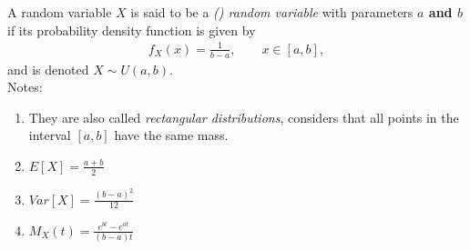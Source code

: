\documentclass[12pt]{article}
\begin{document}
A random variable $X$ is said to be a \emph{ () random variable} with parameters \textbf{$a$ and $b$} if its probability density function is given by
\begin{align*}
f_X(x) = \frac{1}{b-a},\quad\quad x \in [a,b],
\end{align*}
and is denoted $X\sim U(a,b)$.\\

Notes:
\begin{enumerate}
\item They are also called \emph{rectangular distributions}, considers that all points in the interval $[a,b]$ have the same mass.
\item $E[X] = \frac{a+b}{2}$
\item $Var[X] = \frac{(b-a)^2}{12}$
\item $M_X(t) = \frac{e^{bt} - e^{at}}{(b-a)t}$

\end{enumerate}
\end{document}
